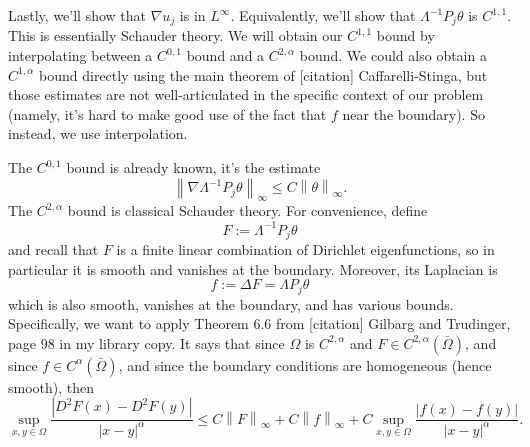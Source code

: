 \documentclass[11pt]{amsart}
\theoremstyle{remark}
\newcommand{\norm}[1]{\left\lVert#1\right\rVert}
\newcommand{\abs}[1]{\left\lvert #1 \right\rvert}
\newcommand{\grad}{\nabla}
\newcommand{\Laplace}{\Delta}
\begin{document}
Lastly, we'll show that $\grad u_j$ is in $L^\infty$.  Equivalently, we'll show that $\Lambda^{-1} P_j \theta$ is $C^{1,1}$.  This is essentially Schauder theory.  We will obtain our $C^{1,1}$ bound by interpolating between a $C^{0,1}$ bound and a $C^{2,\alpha}$ bound.  We could also obtain a $C^{1,\alpha}$ bound directly using the main theorem of [citation] Caffarelli-Stinga, but those estimates are not well-articulated in the specific context of our problem (namely, it's hard to make good use of the fact that $f$ near the boundary).  So instead, we use interpolation.  

The $C^{0,1}$ bound is already known, it's the estimate
\[ \norm{\grad \Lambda^{-1} P_j \theta}_\infty \leq C \norm{\theta}_\infty. \]
The $C^{2,\alpha}$ bound is classical Schauder theory.  For convenience, define 
\[ F := \Lambda^{-1} P_j \theta \]
and recall that $F$ is a finite linear combination of Dirichlet eigenfunctions, so in particular it is smooth and vanishes at the boundary.  Moreover, its Laplacian is 
\[ f := \Laplace F = \Lambda P_j \theta \]
which is also smooth, vanishes at the boundary, and has various bounds.  Specifically, we want to apply Theorem 6.6 from [citation] Gilbarg and Trudinger, page 98 in my library copy.  It says that since $\Omega$ is $C^{2,\alpha}$ and $F \in C^{2,\alpha}(\bar{\Omega})$, and since $f \in C^\alpha(\bar{\Omega})$, and since the boundary conditions are homogeneous (hence smooth), then
\[ \sup_{x,y \in \Omega} \frac{\abs{D^2 F(x)- D^2 F(y)}}{|x-y|^\alpha} \leq C \norm{F}_\infty + C \norm{f}_\infty + C \sup_{x,y\in\Omega} \frac{\abs{f(x)-f(y)}}{|x-y|^\alpha}. \]
\end{document}
